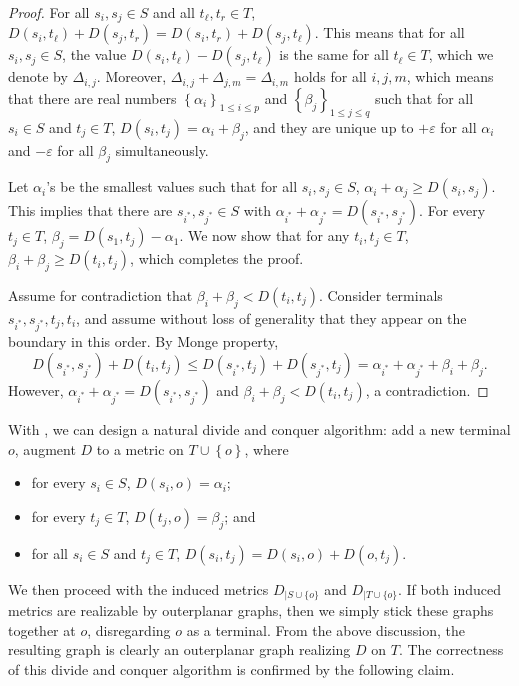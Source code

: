 \documentclass[11pt]{article}
\newcommand{\eps}{{\varepsilon}}
\newcommand{\set}[1]{\left\{ #1 \right\}}
\begin{document}
\begin{proof}
For all $s_i,s_j \in S$ and all $t_\ell,t_r \in T$, 
$D(s_i,t_\ell)+D(s_j,t_r)=D(s_i,t_r)+D(s_j,t_\ell)$.
This means that for all $s_i,s_j \in S$, the value $D(s_i,t_{\ell})-D(s_j,t_{\ell})$ is the same for all $t_{\ell} \in T$, which we denote by $\Delta_{i,j}$. Moreover, $\Delta_{i,j}+\Delta_{j,m}=\Delta_{i,m}$ holds for all $i,j,m$, which means that there are real numbers $\set{\alpha_i}_{1\le i\le p}$ and $\set{\beta_j}_{1\le j\le q}$ such that for all $s_i\in S$ and $t_j \in T$, $D(s_i,t_j)=\alpha_i+\beta_j$, and they are unique up to $+\eps$ for all $\alpha_i$ and $-\eps$ for all $\beta_j$ simultaneously.

Let $\alpha_i$'s be the smallest values such that for all $s_i,s_j\in S$, $\alpha_i+\alpha_j \ge D (s_i,s_j)$. This implies that there are $s_{i^*},s_{j^*}\in S$ with $\alpha_{i^*}+\alpha_{j^*} = D(s_{i^*},s_{j^*})$. For every $t_j\in T$, $\beta_j=D(s_1,t_j)-\alpha_1$. We now show that for any $t_i,t_j \in T$, $\beta_i+\beta_j \ge D (t_i,t_j)$, which completes the proof. 

Assume for contradiction that $\beta_i+\beta_j < D (t_i,t_j)$. Consider terminals $s_{i^*},s_{j^*},t_j,t_i$, and assume without loss of generality that they appear on the boundary in this order. By Monge property, 
    \[    
    D(s_{i^*},s_{j^*})+D (t_i,t_j) \le D(s_{i^*},t_j)+D (s_{j^*},t_j) = \alpha_{i^*}+\alpha_{j^*}+\beta_i+\beta_j.
    \]
    However, $\alpha_{i^*}+\alpha_{j^*} = D(s_{i^*},s_{j^*})$ and $\beta_i+\beta_j < D (t_i,t_j)$, a contradiction.
\end{proof}

With , we can design a natural divide and conquer algorithm: add a new terminal $o$, augment $D$ to a metric on $T\cup \set{o}$, where
\begin{itemize}
    \item for every $s_i\in S$, $D(s_i,o)=\alpha_i$;
    \item for every $t_j\in T$, $D(t_j,o)=\beta_j$; and
    \item for all $s_i \in S$ and $t_j \in T$, $D(s_i,t_j)=D(s_i,o)+D(o,t_j)$.
\end{itemize} 
We then proceed with the induced metrics $D_{\mid S \cup \{o\}}$ and $D_{\mid T \cup \{o\}}$. If both induced metrics are realizable by outerplanar graphs, then we simply stick these graphs together at $o$, disregarding $o$ as a terminal. From the above discussion, the resulting graph is clearly an outerplanar graph realizing $D$ on $T$.
The correctness of this divide and conquer algorithm is confirmed by the following claim.
\end{document}
